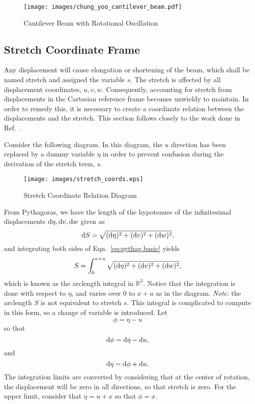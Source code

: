 \begin{figure}[ht!]
\caption{Cantilever Beam with Rotational Oscillation \cite{chung2002dynamic}}
\centering
\texttt{[image: images/chung\_yoo\_cantilever\_beam.pdf]}
\end{figure}

\subsection{Stretch Coordinate Frame}
\label{subsec:stretch}
Any displacement will cause elongation or shortening of the beam, which shall be named stretch and assigned the variable $s$. The stretch is affected by all displacement coordinates, $u,v,w$. Consequently, accounting for stretch from displacements in the Cartesian reference frame becomes unwieldy to maintain. In order to remedy this, it is necessary to create a coordinate relation between the displacements and the stretch. This section follows closely to the work done in Ref.~\cite{lima2012thesis}.

Consider the following diagram. In this diagram, the $u$ direction has been replaced by a dummy variable $\eta$ in order to prevent confusion during the derivation of the stretch term, $s$. 

\begin{figure}[ht!]
\caption{Stretch Coordinate Relation Diagram \cite{lima2012thesis}}
\centering
\texttt{[image: images/stretch\_coords.eps]}
\end{figure}

From Pythagoras, we have the length of the hypotenuse of the infinitesimal displacements $\text d\eta, \text dv, \text dw$ given as
\begin{equation}
\text dS = \sqrt{(\text d\eta)^2+(\text dv)^2+(\text dw)^2},
\label{eq:pythag.basic}
\end{equation}
and integrating both sides of Eqn.~\ref{eq:pythag.basic} yields
\begin{equation}
S = \int_0^{x+u} \sqrt{(\text d\eta)^2+(\text dv)^2+(\text dw)^2},
\label{eq:arclength.a}
\end{equation}
which is known as the arclength integral in $\mathbb R^3$. Notice that the integration is done with respect to $\eta$, and varies over 0 to $x+u$ as in the diagram. \emph{Note:} the arclength $S$ is not equivalent to stretch $s$. This integral is complicated to compute in this form, so a change of variable is introduced. Let
\begin{equation}
\phi = \eta - u
\end{equation}
so that
\begin{equation}
\text d\phi = \text d\eta - \text du,
\end{equation}
and
\begin{equation}
\text d\eta = \text d\phi + \text du.
\label{eq:pythag.subs.vars}
\end{equation}
The integration limits are converted by considering that at the center of rotation, the displacement will be zero in all directions, so that stretch is zero. For the upper limit, consider that $\eta = u+x$ so that $\phi = x$. 

